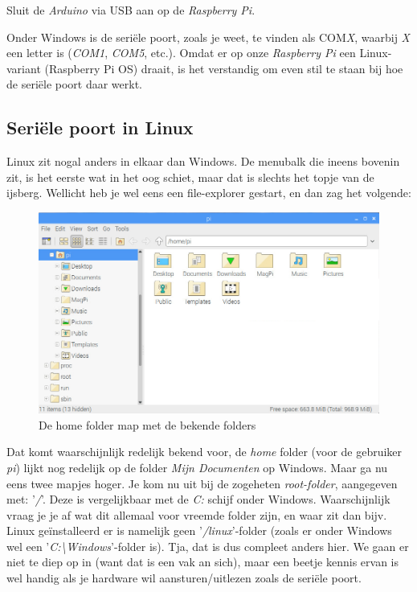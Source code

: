 \begin{exercise}
  Sluit de \textit{Arduino} via USB aan op de \textit{Raspberry Pi}.
\end{exercise}
Onder Windows is de seriële poort, zoals je weet, te vinden als COM\textit{X}, waarbij \textit{X} een letter is (\textit{COM1}, \textit{COM5}, etc.). Omdat er op onze \textit{Raspberry Pi} een Linux-variant (Raspberry Pi OS) draait, is het verstandig om even stil te staan bij hoe de seriële poort daar werkt.

\newpage 

\subsection{Seriële poort in Linux}
Linux zit nogal anders in elkaar dan Windows. De menubalk die ineens bovenin zit, is het eerste wat in het oog schiet, maar dat is slechts het topje van de ijsberg. Wellicht heb je wel eens een file-explorer gestart, en dan zag het volgende: 
\begin{figure}[h!]
\centering\includegraphics[scale=0.35]{Pictures/chapter08/home_folder.png}
  \caption{\small De home folder map met de bekende folders} 
\label{fig:home_folder} %
\end{figure}

Dat komt waarschijnlijk redelijk bekend voor, de \textit{home} folder (voor de gebruiker \textit{pi}) lijkt nog redelijk op de folder \textit{Mijn Documenten} op Windows. Maar ga nu eens twee mapjes hoger. Je kom nu uit bij de zogeheten \textit{root-folder}, aangegeven met: '\textit{/}'. Deze is vergelijkbaar met de \textit{C:} schijf onder Windows. 
Waarschijnlijk vraag je je af wat dit allemaal voor vreemde folder zijn, en waar zit dan bijv. Linux geïnstalleerd er is namelijk geen '\textit{/linux}'-folder (zoals er onder Windows wel een '\textit{C:\textbackslash Windows}'-folder is). Tja, dat is dus compleet anders hier. We gaan er niet te diep op in (want dat is een vak an sich), maar een beetje kennis ervan is wel handig als je hardware wil aansturen/uitlezen zoals de seriële poort.

